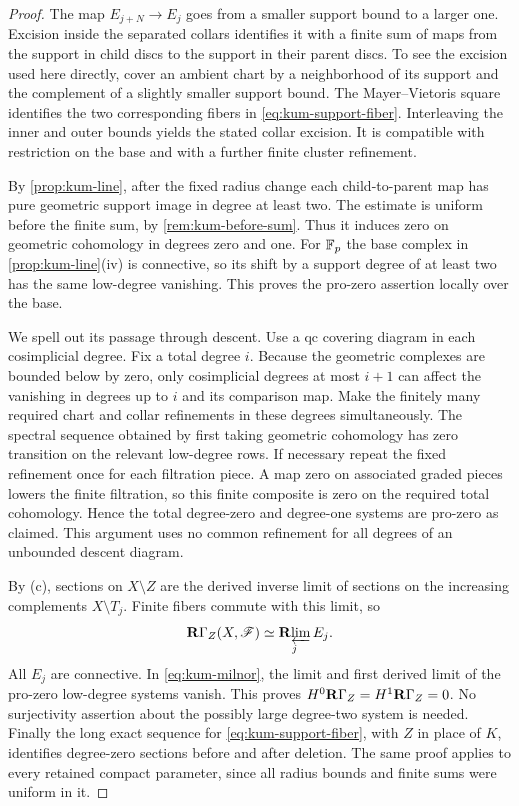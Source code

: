 \begin{proof}
The map $E_{j+N}\to E_j$ goes from a smaller support bound to a
larger one.  Excision inside the separated collars identifies it
with a finite sum of maps from the support in child discs to
the support in their parent discs.  To see the excision used
here directly, cover an ambient chart by a neighborhood of its
support and the complement of a slightly smaller support bound.
The Mayer--Vietoris square identifies the two corresponding
fibers in \cref{eq:kum-support-fiber}.  Interleaving the inner
and outer bounds yields the stated collar excision.  It is
compatible with restriction on the base and with a further
finite cluster refinement.

By \cref{prop:kum-line}, after the fixed radius change each
child-to-parent map has pure geometric support image in degree
at least two.  The estimate is uniform before the finite sum,
by \cref{rem:kum-before-sum}.  Thus it induces zero on geometric
cohomology in degrees zero and one.  For $\mathbb F_p$ the base complex
in \cref{prop:kum-line}(iv) is connective, so its shift by a
support degree of at least two has the same low-degree
vanishing.  This proves the pro-zero assertion locally over
the base.

We spell out its passage through descent.  Use a qc covering
diagram in each cosimplicial degree.  Fix a total degree $i$.
Because the geometric complexes are bounded below by zero,
only cosimplicial degrees at most $i+1$ can affect the vanishing
in degrees up to $i$ and its comparison map.  Make the finitely
many required chart and collar refinements in these degrees
simultaneously.  The spectral sequence obtained by first taking
geometric cohomology has zero transition on the relevant
low-degree rows.  If necessary repeat the fixed refinement
once for each filtration piece.  A map zero on associated
graded pieces lowers the finite filtration, so this finite
composite is zero on the required total cohomology.  Hence the
total degree-zero and degree-one systems are pro-zero as
claimed.  This argument uses no common refinement for all
degrees of an unbounded descent diagram.

By (c), sections on $X\setminus Z$ are the derived inverse
limit of sections on the increasing complements
$X\setminus T_j$.  Finite fibers commute with this limit, so
\begin{equation}\label{eq:kum-closed-support-limit}
 \mathbf R\Gamma_Z(X,\mathscr F)\simeq\mathop{\mathbf R\!\varprojlim}_j E_j.
\end{equation}
All $E_j$ are connective.  In
\cref{eq:kum-milnor}, the limit and first derived limit of the
pro-zero low-degree systems vanish.  This proves
$H^0\mathbf R\Gamma_Z=H^1\mathbf R\Gamma_Z=0$.  No surjectivity assertion about
the possibly large degree-two system is needed.  Finally the
long exact sequence for \cref{eq:kum-support-fiber}, with $Z$
in place of $K$, identifies degree-zero sections before and
after deletion.  The same proof applies to every retained
compact parameter, since all radius bounds and finite sums
were uniform in it.


\end{proof}
